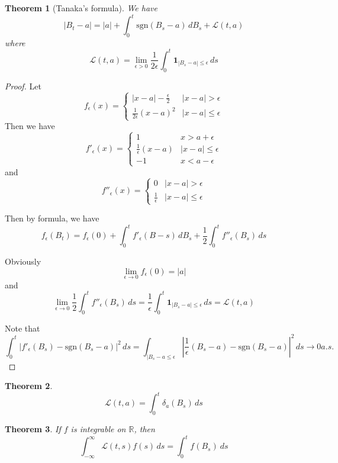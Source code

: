 \documentclass[10pt, oneside, reqno]{amsart}
\theoremstyle{plain}%
\newtheorem{thm}{Theorem}[section]
\theoremstyle{definition}
\theoremstyle{remark}
\newcommand{\R}{\mathbb{R}}
\begin{document}
\begin{thm}[Tanaka's formula]
    We have \[
        |B_t - a | = |a| + \int_0^t \text{sgn}(B_s - a) \, dB_s + \mathcal L(t, a)
    \] where \[\mathcal L(t,a) = \lim_{\epsilon > 0} \frac{1}{2 \epsilon} \int_0^t \mathbf{1}_{|B_s - a| \leq \epsilon} \, ds
    \]
\end{thm}
\begin{proof}
    Let \[
        f_\epsilon(x) = \begin{cases}
            |x-a| - \frac{\epsilon}{2} &|x-a| > \epsilon \\
            \frac{1}{2 \epsilon}(x-a)^2 &|x-a| \leq \epsilon
        \end{cases}
    \]  Then we have \[
        f'_\epsilon(x) = \begin{cases}
            1 &x > a + \epsilon \\
            \frac{1}{\epsilon}(x-a) &|x-a| \leq \epsilon \\
            -1 &x < a - \epsilon
        \end{cases}
    \] and \[
    f''_\epsilon(x) = \begin{cases}
        0 &|x-a| > \epsilon \\
        \frac{1}{\epsilon} &|x-a| \leq \epsilon
    \end{cases} 
    \]
    
    Then by \itos formula, we have \[
        f_\epsilon(B_t) = f_\epsilon(0) + \int_0^t f'_\epsilon(B-s) \, dB_s + \frac{1}{2} \int_0^t f''_\epsilon(B_s) \, ds  \]
        
    Obviously \[
        \lim_{\epsilon \rightarrow 0} f_\epsilon(0) = |a|
    \] and \[
        \lim_{\epsilon \rightarrow 0} \frac{1}{2} \int_0^t f''_\epsilon(B_s) \, ds = \frac{1}{\epsilon} \int_0^t \mathbf{1}_{|B_s - a| \leq \epsilon} \, ds = \mathcal L(t, a)
    \]
    
    Note that \[
        \int_0^t \left| f'_\epsilon(B_s) - \text{sgn}(B_s  - a) \right|^2 \, ds =  \int_{|B_s - a \leq \epsilon} \left| \frac{1}{\epsilon}(B_s - a) - \text{sgn}(B_s - a) \right|^2 \, ds \rightarrow 0 a.s.
    \]
\end{proof}

\begin{thm}
    \[
        \mathcal L(t,a) = \int_0^t \delta_a(B_s) \,ds
    \]
\end{thm}
\begin{thm}
    If $f$ is integrable on $\R$, then \[
        \int_{-\infty}^\infty \mathcal L(t,s) f(s) \, ds = \int_0^t f(B_s) \ ds
    \]
\end{thm}
\end{document}
